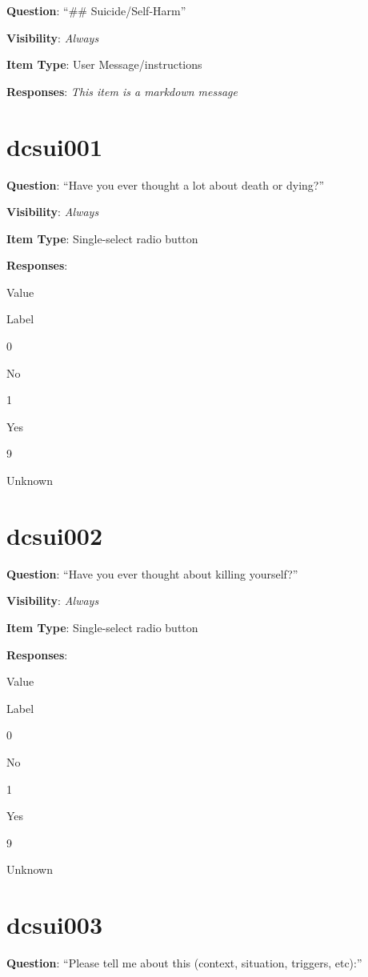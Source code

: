 \documentclass[]{book}
\begin{document}
\textbf{Question}: ``\#\# Suicide/Self-Harm''

\textbf{Visibility}: \emph{Always}

\textbf{Item Type}: User Message/instructions

\textbf{Responses}: \emph{This item is a markdown message}

\hypertarget{dcsui001}{%
\section{dcsui001}\label{dcsui001}}

\textbf{Question}: ``Have you ever thought a lot about death or dying?''

\textbf{Visibility}: \emph{Always}

\textbf{Item Type}: Single-select radio button

\textbf{Responses}:

Value

Label

0

No

1

Yes

9

Unknown

\hypertarget{dcsui002}{%
\section{dcsui002}\label{dcsui002}}

\textbf{Question}: ``Have you ever thought about killing yourself?''

\textbf{Visibility}: \emph{Always}

\textbf{Item Type}: Single-select radio button

\textbf{Responses}:

Value

Label

0

No

1

Yes

9

Unknown

\hypertarget{dcsui003}{%
\section{dcsui003}\label{dcsui003}}

\textbf{Question}: ``Please tell me about this (context, situation, triggers, etc):''
\end{document}
